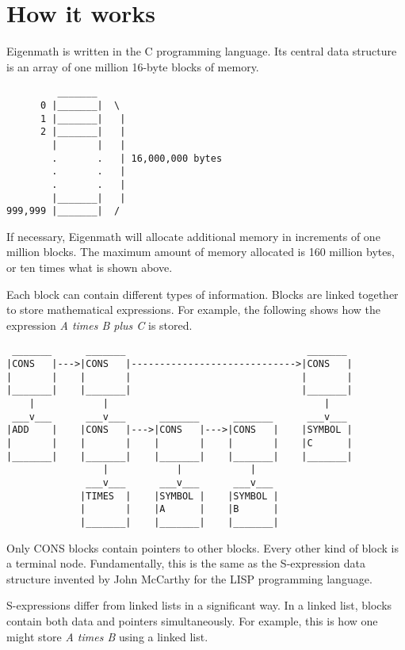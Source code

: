 \chapter{How it works}

Eigenmath is written in the C programming language.
Its central data structure is
an array of one million 16-byte blocks of memory.

\begin{verbatim}
         _______ 
      0 |_______|  \
      1 |_______|   |
      2 |_______|   |
        |       |   |
        .       .   | 16,000,000 bytes
        .       .   |
        .       .   |
        |_______|   |
999,999 |_______|  /
\end{verbatim}

\medskip
\noindent
If necessary, Eigenmath will allocate additional memory in increments of one
million blocks.
The maximum amount of memory allocated is 160 million bytes,
or ten times what is shown above.

\newpage

\noindent
Each block can contain different types of information.
Blocks are linked together to store mathematical expressions.
For example, the following shows how the expression
{\it A times B plus C} is stored.

\begin{verbatim}
 _______      _______                                _______
|CONS   |--->|CONS   |----------------------------->|CONS   |
|       |    |       |                              |       |
|_______|    |_______|                              |_______|
    |            |                                      |
 ___v___      ___v___      _______      _______      ___v___
|ADD    |    |CONS   |--->|CONS   |--->|CONS   |    |SYMBOL |
|       |    |       |    |       |    |       |    |C      |
|_______|    |_______|    |_______|    |_______|    |_______|
                 |            |            |
              ___v___      ___v___      ___v___
             |TIMES  |    |SYMBOL |    |SYMBOL |
             |       |    |A      |    |B      |
             |_______|    |_______|    |_______|
\end{verbatim}

\medskip
\noindent
Only CONS blocks contain pointers to other blocks.
Every other kind of block is a terminal node.
Fundamentally, this is the same as the S-expression data structure invented by
John McCarthy for the
LISP programming language.

\medskip
\noindent
S-expressions differ from linked lists in a significant way.
In a linked list, blocks contain both data and pointers simultaneously.
For example, this is how one might store {\it A times B} using a linked list.

